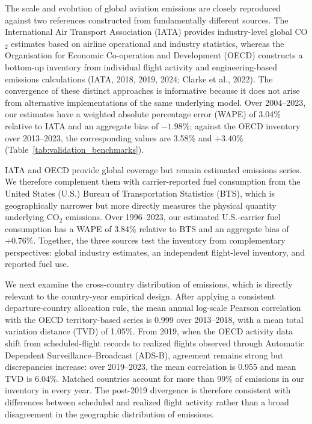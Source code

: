 \documentclass[12pt]{extarticle}
\begin{document}
The scale and evolution of global aviation emissions are closely reproduced against two references constructed from fundamentally different sources. The International Air Transport Association (IATA) provides industry-level global CO$_2$ estimates based on airline operational and industry statistics, whereas the Organisation for Economic Co-operation and Development (OECD) constructs a bottom-up inventory from individual flight activity and engineering-based emissions calculations (IATA, 2018, 2019, 2024; Clarke et al., 2022). The convergence of these distinct approaches is informative because it does not arise from alternative implementations of the same underlying model. Over 2004--2023, our estimates have a weighted absolute percentage error (WAPE) of 3.04\% relative to IATA and an aggregate bias of $-1.98\%$; against the OECD inventory over 2013--2023, the corresponding values are 3.58\% and $+3.40\%$ (Table~\ref{tab:validation_benchmarks}).

IATA and OECD provide global coverage but remain estimated emissions series. We therefore complement them with carrier-reported fuel consumption from the United States (U.S.) Bureau of Transportation Statistics (BTS), which is geographically narrower but more directly measures the physical quantity underlying CO$_2$ emissions. Over 1996--2023, our estimated U.S.-carrier fuel consumption has a WAPE of 3.84\% relative to BTS and an aggregate bias of $+0.76\%$. Together, the three sources test the inventory from complementary perspectives: global industry estimates, an independent flight-level inventory, and reported fuel use.

We next examine the cross-country distribution of emissions, which is directly relevant to the country-year empirical design. After applying a consistent departure-country allocation rule, the mean annual log-scale Pearson correlation with the OECD territory-based series is 0.999 over 2013--2018, with a mean total variation distance (TVD) of 1.05\%. From 2019, when the OECD activity data shift from scheduled-flight records to realized flights observed through Automatic Dependent Surveillance--Broadcast (ADS-B), agreement remains strong but discrepancies increase: over 2019--2023, the mean correlation is 0.955 and mean TVD is 6.04\%. Matched countries account for more than 99\% of emissions in our inventory in every year. The post-2019 divergence is therefore consistent with differences between scheduled and realized flight activity rather than a broad disagreement in the geographic distribution of emissions.
\end{document}
